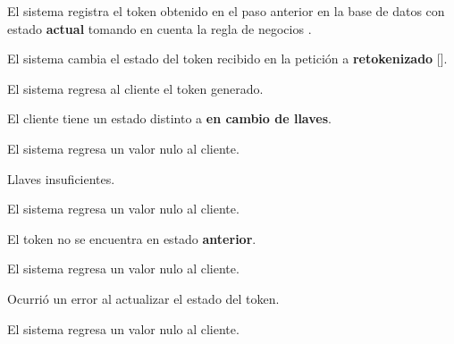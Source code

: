 {\begin{trayectoriaPrincipal}
    \item El sistema registra el token obtenido en el paso anterior en la base
      de datos con estado \textbf{actual} tomando en cuenta la regla de negocios
      .

    \item El sistema cambia el estado del token recibido en la petición
      a \textbf{retokenizado} [].

    \item [regreso_token] El sistema regresa al cliente el token generado.

  \end{trayectoriaPrincipal}

  \begin{trayectoriaAlternativa}
    {El cliente tiene un estado distinto a \textbf{en cambio de llaves}.}

    \item El sistema regresa un valor nulo al cliente.

  \end{trayectoriaAlternativa}

  \begin{trayectoriaAlternativa}
    {Llaves insuficientes.}

    \item El sistema regresa un valor nulo al cliente.

  \end{trayectoriaAlternativa}

  \begin{trayectoriaAlternativa}
    {El token no se encuentra en estado \textbf{anterior}.}

    \item El sistema regresa un valor nulo al cliente.

  \end{trayectoriaAlternativa}

  \begin{trayectoriaAlternativa}
    {Ocurrió un error al actualizar el estado del token.}

    \item El sistema regresa un valor nulo al cliente.

  \end{trayectoriaAlternativa}

}
